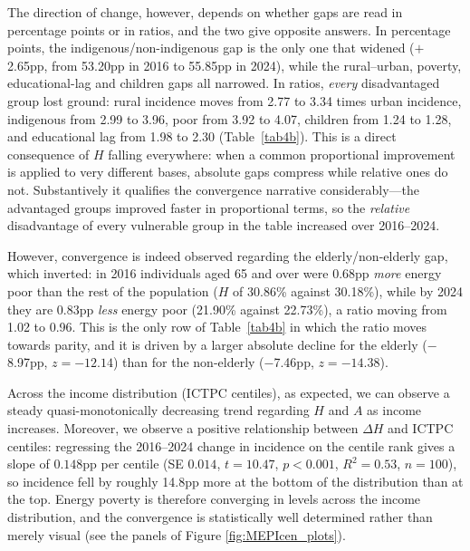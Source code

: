 \documentclass[11pt, a4paper]{article}
\begin{document}
The direction of change, however, depends on whether gaps are read in percentage points or in ratios, and the two give opposite answers. In percentage points, the indigenous/non-indigenous gap is the only one that widened ($+$2.65pp, from 53.20pp in 2016 to 55.85pp in 2024), while the rural--urban, poverty, educational-lag and children gaps all narrowed. In ratios, \emph{every} disadvantaged group lost ground: rural incidence moves from 2.77 to 3.34 times urban incidence, indigenous from 2.99 to 3.96, poor from 3.92 to 4.07, children from 1.24 to 1.28, and educational lag from 1.98 to 2.30 (Table~\ref{tab4b}). This is a direct consequence of $H$ falling everywhere: when a common proportional improvement is applied to very different bases, absolute gaps compress while relative ones do not. Substantively it qualifies the convergence narrative considerably---the advantaged groups improved faster in proportional terms, so the \emph{relative} disadvantage of every vulnerable group in the table increased over 2016--2024.

However, convergence is indeed observed regarding the elderly/non-elderly gap, which inverted: in 2016 individuals aged 65 and over were 0.68pp \emph{more} energy poor than the rest of the population ($H$ of 30.86\% against 30.18\%), while by 2024 they are 0.83pp \emph{less} energy poor (21.90\% against 22.73\%), a ratio moving from 1.02 to 0.96. This is the only row of Table~\ref{tab4b} in which the ratio moves towards parity, and it is driven by a larger absolute decline for the elderly ($-$8.97pp, $z=-12.14$) than for the non-elderly ($-$7.46pp, $z=-14.38$).

Across the income distribution (ICTPC centiles), as expected, we can observe a steady quasi-monotonically decreasing trend regarding $H$ and $A$ as income increases. Moreover, we observe a positive relationship between $\Delta H$ and ICTPC centiles: regressing the 2016--2024 change in incidence on the centile rank gives a slope of $0.148$pp per centile (SE $0.014$, $t=10.47$, $p<0.001$, $R^2=0.53$, $n=100$), so incidence fell by roughly 14.8pp more at the bottom of the distribution than at the top. Energy poverty is therefore converging in levels across the income distribution, and the convergence is statistically well determined rather than merely visual (see the panels of Figure \ref{fig:MEPIcen_plots}).
\end{document}
